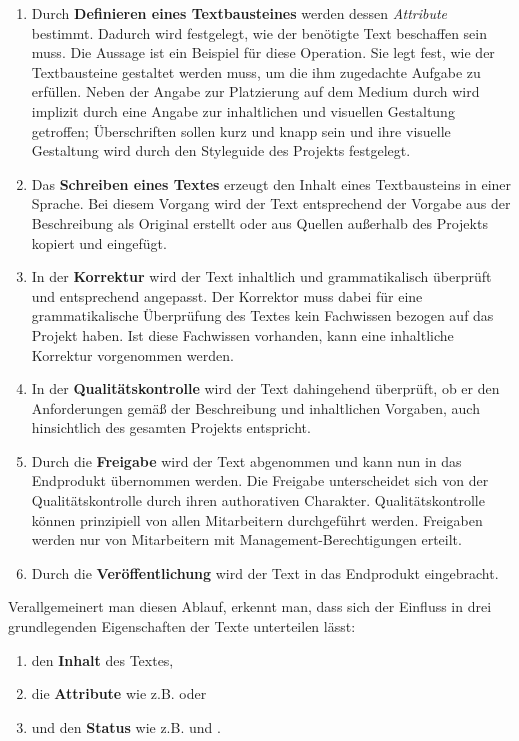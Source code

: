 \begin{enumerate}
\item Durch \textbf{Definieren eines Textbausteines} werden dessen \emph{Attribute} bestimmt. Dadurch wird festgelegt, wie der benötigte Text beschaffen sein muss. Die Aussage  ist ein Beispiel für diese Operation. Sie legt fest, wie der Textbausteine gestaltet werden muss, um die ihm zugedachte Aufgabe zu erfüllen. Neben der Angabe zur Platzierung auf dem Medium durch  wird implizit durch  eine Angabe zur inhaltlichen und visuellen Gestaltung getroffen; Überschriften sollen kurz und knapp sein und ihre visuelle Gestaltung wird durch den Styleguide des Projekts festgelegt.
\item Das \textbf{Schreiben eines Textes} erzeugt den Inhalt eines Textbausteins in einer Sprache. Bei diesem Vorgang wird der Text entsprechend der Vorgabe aus der Beschreibung als Original erstellt oder aus Quellen außerhalb des Projekts kopiert und eingefügt.
\item In der \textbf{Korrektur} wird der Text inhaltlich und grammatikalisch überprüft und entsprechend angepasst. Der Korrektor muss dabei für eine grammatikalische Überprüfung des Textes kein Fachwissen bezogen auf das Projekt haben. Ist diese Fachwissen vorhanden, kann eine inhaltliche Korrektur vorgenommen werden.
\item In der \textbf{Qualitätskontrolle} wird der Text dahingehend überprüft, ob er den Anforderungen gemäß der Beschreibung und inhaltlichen Vorgaben, auch hinsichtlich des gesamten Projekts entspricht.
\item Durch die \textbf{Freigabe} wird der Text abgenommen und kann nun in das Endprodukt übernommen werden. Die Freigabe unterscheidet sich von der Qualitätskontrolle durch ihren authorativen Charakter. Qualitätskontrolle können prinzipiell von allen Mitarbeitern durchgeführt werden. Freigaben werden nur von Mitarbeitern mit Management-Berechtigungen erteilt.
\item Durch die \textbf{Veröffentlichung} wird der Text in das Endprodukt eingebracht.
\end{enumerate}

\begin{samepage}
Verallgemeinert man diesen Ablauf, erkennt man, dass sich der Einfluss in drei grundlegenden Eigenschaften der Texte unterteilen lässt:

\begin{enumerate}\itemsep -5pt
\item den \textbf{Inhalt} des Textes,
\item die \textbf{Attribute} wie z.B.  oder 
\item und den \textbf{Status} wie z.B.  und .
\end{enumerate}
\end{samepage}

